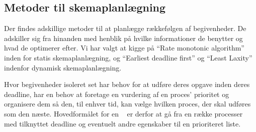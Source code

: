


\subsection{Metoder til skemaplanlægning}
Der findes adskillige metoder til at planlægge rækkefølgen af begivenheder. De adskiller sig fra hinanden med henblik på hvilke informationer de benytter og hvad de optimerer efter. Vi har valgt at kigge på ``Rate monotonic algorithm''\cite{lehoczky1989rate,liu1973scheduling} inden for statis skemaplanlægning, og ``Earliest deadline first''\cite{liu1973scheduling} og ``Least Laxity'' indenfor dynamisk skemaplanlægning.

Hvor begivenheder isoleret set har behov for at udføre deres opgave inden deres deadline, har \sched en behov at foretage en vurdering af en proces' prioritet og organisere dem så den, til enhver tid, kan vælge hvilken proces, der skal udføres som den næste. Hovedformålet for en  \sched ~ er derfor at gå fra en række processer med tilknyttet deadline og eventuelt andre egenskaber til en prioriteret liste. 

